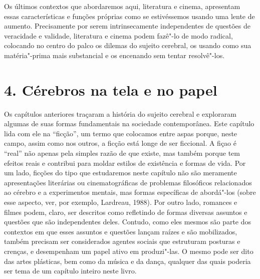 Os últimos contextos que abordaremos aqui, literatura e cinema,
apresentam essas características e funções próprias como se estivéssemos
usando uma lente de aumento. Precisamente por serem intrinsecamente
independentes de questões de veracidade e validade, literatura e cinema
podem fazê"-lo de modo radical, colocando no centro do palco os dilemas
do sujeito cerebral, os usando como sua matéria"-prima mais substancial e
os encenando sem tentar resolvê"-los.

\chapter{4. Cérebros na tela e no papel}

Os capítulos anteriores traçaram a história do sujeito cerebral e
exploraram algumas de suas formas fundamentais na sociedade
contemporânea. Este capítulo lida com ele na ``ficção'', um termo que
colocamos entre aspas porque, neste campo, assim como nos outros, a
ficção está longe de ser ficcional. A fiçao é ``real'' não apenas pela
simples razão de que existe, mas também porque tem efeitos reais e
contribui para moldar estilos de existência e formas de vida. Por um
lado, ficções do tipo que estudaremos neste capítulo não são meramente
apresentações literárias ou cinematográficas de problemas filosóficos
relacionados ao cérebro e a experimentos mentais, mas formas específicas
de abordá"-los (sobre esse aspecto, ver, por exemplo, Lardreau, 1988).
Por outro lado, romances e filmes podem, claro, ser descritos como
refletindo de formas diversas assuntos e questões que são independentes
deles. Contudo, como eles mesmos são parte dos contextos em que esses
assuntos e questões lançam raízes e são mobilizados, também precisam ser
considerados agentes sociais que estruturam posturas e crenças, e
desempenham um papel ativo em produzi"-las. O mesmo pode ser dito das
artes plásticas, bem como da música e da dança, qualquer das quais
poderia ser tema de um capítulo inteiro neste livro.

